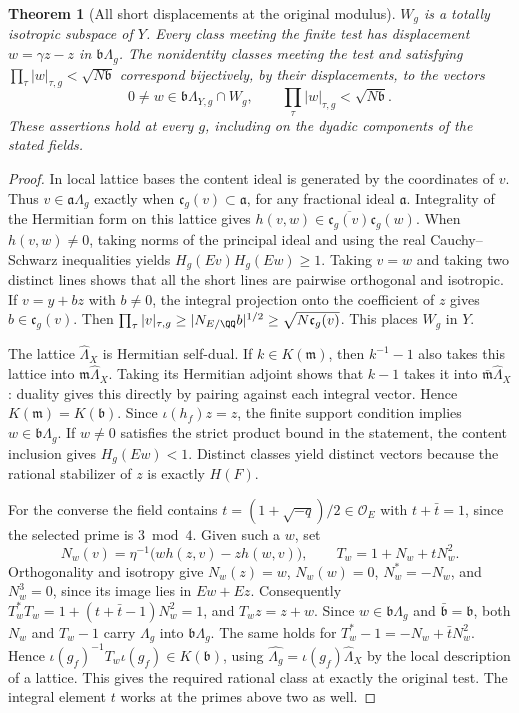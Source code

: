 \documentclass[a4paper,11pt]{article}
\newtheorem{theorem}[proposition]{Theorem}
\theoremstyle{definition}
\theoremstyle{remark}
\numberwithin{equation}{section}
\begin{document}
\begin{theorem}[All short displacements at the original modulus]
\label{thm:short246}
\(W_g\) is a totally isotropic subspace of \(Y\). Every class
meeting the finite test has displacement \(w=\gamma z-z\) in
\(\mathfrak b\Lambda_g\). The nonidentity classes meeting the test
and satisfying \(\prod_\tau |w|_{\tau,g}<\sqrt{N\mathfrak b}\)
correspond bijectively, by their displacements, to the vectors
\[
 0\ne w\in \mathfrak b\Lambda_{Y,g}\cap W_g,\qquad
                  \prod_\tau |w|_{\tau,g}<\sqrt{N\mathfrak b}.
\]
These assertions hold at every \(g\), including on the dyadic
components of the stated fields.
\end{theorem}
\begin{proof}
In local lattice bases the content ideal is generated by the
coordinates of \(v\). Thus \(v\in\mathfrak a\Lambda_g\) exactly
when \(\mathfrak c_g(v)\subset\mathfrak a\), for any fractional
ideal \(\mathfrak a\). Integrality of the Hermitian form on this
lattice gives \(h(v,w)\in\overline{\mathfrak c_g(v)}\mathfrak c_g(w)\).
When \(h(v,w)\ne0\), taking norms of the principal ideal and using
the real Cauchy--Schwarz inequalities yields \(H_g(Ev)H_g(Ew)\ge1\).
Taking \(v=w\) and taking two distinct lines shows that all the
short lines are pairwise orthogonal and isotropic. If \(v=y+bz\)
with \(b\ne0\), the integral projection onto the coefficient of
\(z\) gives \(b\in\mathfrak c_g(v)\). Then
\(\prod_\tau|v|_{\tau,g}\ge |N_{E/\QQ}b|^{1/2}\ge
\sqrt{N\mathfrak c_g(v)}\). This places \(W_g\) in \(Y\).

The lattice \(\widehat\Lambda_X\) is Hermitian self-dual.
If \(k\in K(\mathfrak m)\), then \(k^{-1}-1\) also takes this
lattice into \(\mathfrak m\widehat\Lambda_X\). Taking its Hermitian
adjoint shows that \(k-1\) takes it into
\(\bar{\mathfrak m}\widehat\Lambda_X\): duality gives this directly
by pairing against each integral vector. Hence
\(K(\mathfrak m)=K(\mathfrak b)\). Since \(\iota(h_f)z=z\),
the finite support condition implies \(w\in\mathfrak b\Lambda_g\).
If \(w\ne0\) satisfies the strict product bound in the statement,
the content inclusion gives \(H_g(Ew)<1\). Distinct classes yield
distinct vectors because the rational stabilizer of \(z\) is
exactly \(H(F)\).

For the converse the field contains
\(t=(1+\sqrt{-q})/2\in\mathcal O_E\) with \(t+\bar t=1\),
since the selected prime is \(3\bmod 4\). Given such a \(w\), set
\[
      N_w(v)=\eta^{-1}\big(w h(z,v)-z h(w,v)\big),
                  \qquad T_w=1+N_w+tN_w^2 .
\]
Orthogonality and isotropy give \(N_w(z)=w\), \(N_w(w)=0\),
\(N_w^*=-N_w\), and \(N_w^3=0\), since its image lies in
\(Ew+Ez\). Consequently
\(T_w^*T_w=1+(t+\bar t-1)N_w^2=1\), and \(T_wz=z+w\).
Since \(w\in\mathfrak b\Lambda_g\) and
\(\bar{\mathfrak b}=\mathfrak b\), both \(N_w\) and \(T_w-1\)
carry \(\Lambda_g\) into \(\mathfrak b\Lambda_g\).
The same holds for \(T_w^*-1=-N_w+\bar tN_w^2\). Hence
\(\iota(g_f)^{-1}T_w\iota(g_f)\in K(\mathfrak b)\), using
\(\widehat{\Lambda_g}=\iota(g_f)\widehat\Lambda_X\) by the
local description of a lattice. This gives the required rational
class at exactly the original test. The integral element \(t\)
works at the primes above two as well.
\end{proof}
\end{document}
